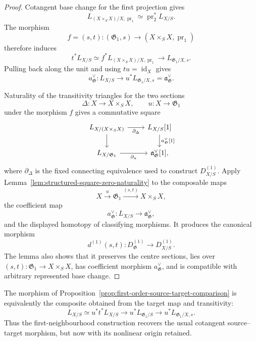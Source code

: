 \begin{proof}
Cotangent base change for the first projection gives
\[
    L_{(X\times_SX)/X,\operatorname{pr}_1}
    \simeq
    \operatorname{pr}_2^*L_{X/S}.
\]
The morphism
\[
    f=(s,t):
    (\mathfrak G_1,s)
    \longrightarrow
    (X\times_SX,\operatorname{pr}_1)
\]
therefore induces
\[
    t^*L_{X/S}
    \simeq
    f^*L_{(X\times_SX)/X,\operatorname{pr}_1}
    \longrightarrow
    L_{\mathfrak G_1/X,s}.
\]
Pulling back along the unit and using
$tu=\operatorname{id}_X$ gives
\[
    a_{\mathfrak G}^{\vee}:
    L_{X/S}
    \longrightarrow
    u^*L_{\mathfrak G_1/X,s}
    =
    \mathfrak a_{\mathfrak G}^{\vee}.
\]

Naturality of the transitivity triangles for the two sections
\[
    \Delta:X\to X\times_SX,
    \qquad
    u:X\to\mathfrak G_1
\]
under the morphism $f$ gives a commutative square
\[
\begin{tikzcd}
L_{X/(X\times_SX)}
    \arrow[r,"{\partial_\Delta}"']
    \arrow[d]
&
L_{X/S}[1]
    \arrow[d,"{a_{\mathfrak G}^{\vee}[1]}"]
\\
L_{X/\mathfrak G_1}
    \arrow[r,"{\partial_u}"']
&
\mathfrak a_{\mathfrak G}^{\vee}[1],
\end{tikzcd}
\]
where $\partial_\Delta$ is the fixed connecting equivalence used to construct
$D^{(1)}_{X/S}$.  Apply
Lemma~\ref{lem:structured-square-zero-naturality} to the composable maps
\[
    X\xrightarrow{u}\mathfrak G_1
    \xrightarrow{(s,t)}X\times_SX,
\]
the coefficient map
\[
    a_{\mathfrak G}^{\vee}:
    L_{X/S}\longrightarrow\mathfrak a_{\mathfrak G}^{\vee},
\]
and the displayed homotopy of classifying morphisms.  It produces the
canonical morphism
\[
    d^{(1)}(s,t):
    D^{(1)}_{\mathfrak G}
    \longrightarrow
    D^{(1)}_{X/S}.
\]
The lemma also shows that it preserves the centre sections, lies over
$(s,t):\mathfrak G_1\to X\times_SX$, has coefficient morphism
$a_{\mathfrak G}^{\vee}$, and is compatible with arbitrary represented base
change.
\end{proof}

\begin{remark}
\label{rem:cotangent-anchor-equivalent-formula}
The morphism of
Proposition~\ref{prop:first-order-source-target-comparison} is equivalently the
composite obtained from the target map and transitivity:
\[
    L_{X/S}
    \simeq
    u^*t^*L_{X/S}
    \longrightarrow
    u^*L_{\mathfrak G_1/S}
    \longrightarrow
    u^*L_{\mathfrak G_1/X,s}.
\]
Thus the first-neighbourhood construction recovers the usual cotangent
source--target morphism, but now with its nonlinear origin retained.
\end{remark}

